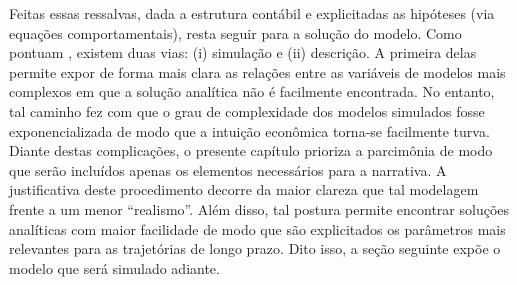 


Feitas essas ressalvas, dada a estrutura contábil e explicitadas as hipóteses (via equações comportamentais), resta seguir para a solução do modelo. Como pontuam \textcite{caverzasi_stock-flow_2013}, existem duas vias: (i) simulação e (ii) descrição. A primeira delas permite expor de forma mais clara as relações entre as variáveis de modelos mais complexos em que a solução analítica não é facilmente encontrada. No entanto, tal caminho fez com que o grau de complexidade dos modelos simulados fosse exponencializada de modo que a intuição econômica torna-se facilmente turva. Diante destas complicações, o presente capítulo prioriza a parcimônia de modo que serão incluídos apenas os elementos necessários para a narrativa. A justificativa deste procedimento decorre da maior clareza que tal modelagem frente a um menor ``realismo''. Além disso, tal postura permite encontrar soluções analíticas com maior facilidade de modo que são explicitados os parâmetros mais relevantes para as trajetórias de longo prazo. Dito isso, a seção seguinte expõe o modelo que será simulado adiante.